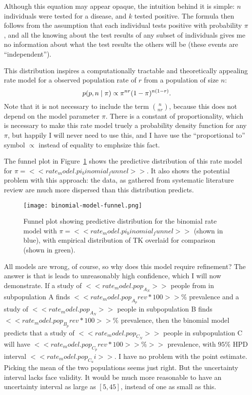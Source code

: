 Although this equation may appear opaque, the intuition behind it is
simple: $n$ individuals were tested for a disease, and $k$ tested
positive. The formula then follows from the assumption that each
individual tests positive with probability $\pi$, and all the
knowing about the test results of any subset of individuals gives me
no information about what the test results the others will be
(these events are ``independent'').

This distribution inspires a computationally tractable and
theoretically appealing rate model for a observed population rate of
$r$ from a population of size $n$:
\[
p(p,n\;|\; \pi) \propto \pi^{nr}(1-\pi)^{n(1-r)}.
\]
Note that it is not necessary to include the term $\binom{n}{nr}$,
because this does not depend on the model parameter $\pi$. There is a
constant of proportionality, which is necessary to make this rate
model truely a probability density function for any $\pi$, but happily
I will never need to use this, and I have use the ``proportional to''
symbol $\propto$ instead of equality to emphsize this fact.

The funnel plot in Figure~\ref{fig:theory-rate_model-binom_funnel}
shows the predictive distribution of this rate model for $\pi=<<
rate_model.pi_binomial_funnel >>$.  It also shows the potential
problem with this approach: the data, as gathered from systematic
literature review are much more dispersed than this distribution
predicts.

\begin{figure}[ht]
\begin{center}
\texttt{[image: binomial-model-funnel.png]}
\end{center}
\caption{Funnel plot showing predictive distribution for the binomial
  rate model with $\pi=<< rate_model.pi_binomial_funnel >>$ (shown in
  blue), with empirical distribution of TK overlaid for comparison
  (shown in green).}
\label{fig:theory-rate_model-binom_funnel}
\end{figure}

All models are wrong, of course, so why does this model require
refinement? The answer is that is leads to unreasonably high confidence,
which I will now demonstrate.  If a study of $<< rate_model.pop_A_N >>$
 people from in subpopulation A
finds $<< rate_model.pop_A_prev*100 >>\%$ prevalence and a
study of $<< rate_model.pop_A_N >>$ people in subpopulation B
 finds $<< rate_model.pop_B_prev*100
>>\%$ prevalence, then the binomial model predicts that a study of
$<< rate_model.pop_C_N >>$ people in subpopulation C will
 have $<< rate_model.pop_C_prev*100>>\%>>$ prevalence, with $95\%$ HPD interval
$<< rate_model.pop_C_ui >>$.  I have no problem with the point
 estimate.  Picking the mean of the two populations seems just right.
 But the uncertainty interval lacks face validity.  It would be much
 more reasonable to have an uncertainty interval as large as $[5,45]$,
 instead of one as small as this.

